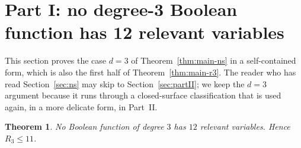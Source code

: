 \documentclass[11pt,reqno]{amsart}
\theoremstyle{plain}
\newtheorem{theorem}{Theorem}
\theoremstyle{definition}
\numberwithin{theorem}{section}
\begin{document}
\section{Part I: no degree-3 Boolean function has 12 relevant variables}\label{sec:partI}

This section proves the case $d = 3$ of Theorem~\ref{thm:main-ns} in a self-contained form,
which is also the first half of Theorem~\ref{thm:main-r3}. The reader who has read
Section~\ref{sec:ns} may skip to Section~\ref{sec:partII}; we keep the $d=3$ argument because it
runs through a closed-surface classification that is used again, in a more delicate form, in
Part~II.

\begin{theorem}\label{thm:no12}
No Boolean function of degree $3$ has $12$ relevant variables. Hence $R_3 \le 11$.
\end{theorem}
\end{document}
